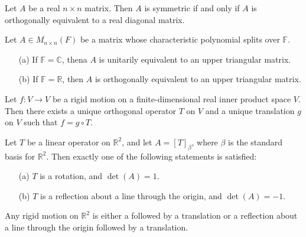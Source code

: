 \vspace{3cm}
\begin{theorem}
    Let \(A\) be a real \(n \times n\) matrix. Then \(A\) is symmetric if and only if \(A\) is orthogonally equivalent to a real diagonal matrix.
\end{theorem}
\vspace{1cm}
\begin{theorem}
    Let \(A \in M_{n \times n}(F)\) be a matrix whose characteristic polynomial splits over \(\mathbb{F}\).
    \begin{enumerate}
        \item[(a)] If \(\mathbb{F} = \mathbb{C}\), thena \(A\) is unitarily equivalent to an upper triangular matrix.
        \item[(b)] If \(\mathbb{F} = \mathbb{R}\), then \(A\) is orthogonally equivalent to an upper triangular matrix. 
    \end{enumerate}
\end{theorem}
\newpage
\begin{theorem}
    Let \(f: V \to V\) be a rigid motion on a finite-dimensional real inner product space \(V\). Then there exists a unique orthogonal operator \(T\) on \(V\) and a unique translation \(g\) on \(V\) such that \(f = g \circ T\).
\end{theorem}
\newpage
\begin{theorem}
    Let \(T\) be a linear operator on \(\mathbb{R}^2\), and let \(A = [T]_{\beta}\), where \(\beta\) is the standard basis for \(\mathbb{R}^2\). Then exactly one of the following statements is satisfied:
    \begin{enumerate}
        \item[(a)] \(T\) is a rotation, and \(\det(A)=1.\)
        \item[(b)] \(T\) is a reflection about a line through the origin, and \(\det(A)=-1.\)
    \end{enumerate}
\end{theorem}
\vspace{7cm}
\begin{corollary}
    Any rigid motion on \(\mathbb{R}^2\) is either a followed by a translation or a reflection about a line through the origin followed by a translation.
\end{corollary}